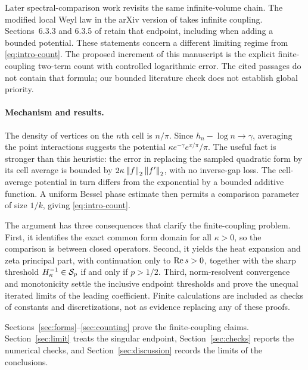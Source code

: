 Later spectral-comparison work revisits the same infinite-volume
chain. The modified local Weyl law in the arXiv version of
\citet[Section 5, Theorem 11]{bifulco2024infinite} takes infinite
coupling. Sections~6.3.3 and 6.3.5 of
\citet{bifulco2025thesis} retain that endpoint, including when adding
a bounded potential. These statements concern a different limiting
regime from \eqref{eq:intro-count}.
The proposed increment of this manuscript is the explicit
finite-coupling two-term count with controlled logarithmic error.
The cited passages do not contain that formula; our bounded
literature check does not establish global priority.

\paragraph{Mechanism and results.}
The density of vertices on the $n$th cell is $n/\pi$.
Since $h_n-\log n\to\gamma$, averaging the point interactions
suggests the potential
$\kappa e^{-\gamma}e^{x/\pi}/\pi$.
The useful fact is stronger than this heuristic:
the error in replacing the sampled quadratic form by its cell
average is bounded by $2\kappa\left\lVert f\right\rVert_2\left\lVert f'\right\rVert_2$, with no
inverse-gap loss. The cell-average potential in turn differs from
the exponential by a bounded additive function.
A uniform Bessel phase estimate then permits a comparison parameter
of size $1/k$, giving \eqref{eq:intro-count}.

The argument has three consequences that clarify the finite-coupling
problem.
First, it identifies the exact common form domain for all
$\kappa>0$, so the comparison is between closed operators.
Second, it yields the heat expansion and zeta principal part,
with continuation only to $\operatorname{Re} s>0$, together with the sharp
threshold $H_\kappa^{-1}\in\mathcal{S}_p$ if and only if $p>1/2$.
Third, norm-resolvent convergence and monotonicity settle the
inclusive endpoint thresholds and prove the unequal iterated
limits of the leading coefficient.
Finite calculations are included as checks of constants and
discretizations, not as evidence replacing any of these proofs.

Sections~\ref{sec:forms}--\ref{sec:counting} prove the finite-coupling
claims. Section~\ref{sec:limit} treats the singular endpoint,
Section~\ref{sec:checks} reports the numerical checks, and
Section~\ref{sec:discussion} records the limits of the conclusions.
